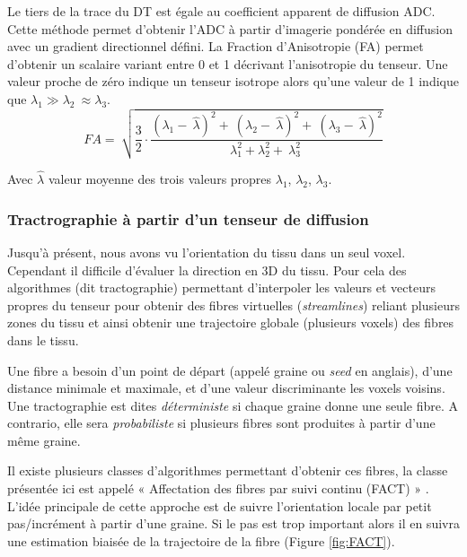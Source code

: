 Le tiers de la trace du DT est égale au coefficient apparent de diffusion ADC. Cette méthode permet d’obtenir l’ADC à partir d’imagerie pondérée en diffusion avec un gradient directionnel défini. La Fraction d’Anisotropie (FA) permet d’obtenir un scalaire variant entre 0 et 1 décrivant l’anisotropie du tenseur. Une valeur proche de zéro indique un tenseur isotrope alors qu’une valeur de 1 indique que $\lambda_1\gg\lambda_2\ \approx\lambda_3$.
\begin{equation}
\nonumber
FA=\ \sqrt{\frac{3}{2}\cdot\frac{{(\lambda_1-\ \hat{\lambda})}^2+\ {(\lambda_2-\ \hat{\lambda})}^2+\ {(\lambda_3-\ \hat{\lambda})}^2}{\lambda_1^2+\lambda_2^2+\ \lambda_3^2\ }}
\end{equation}

Avec $\hat{\lambda}$ valeur moyenne des trois valeurs propres $\lambda_1$, $\lambda_2$, $\lambda_3$. 

\subsubsection{Tractrographie à partir d’un tenseur de diffusion}

Jusqu’à présent, nous avons vu l’orientation du tissu dans un seul voxel. Cependant il difficile d’évaluer la direction en 3D du tissu. Pour cela des algorithmes (dit tractographie) permettant d’interpoler les valeurs et vecteurs propres du tenseur pour obtenir des fibres virtuelles (\textit{streamlines}) reliant plusieurs zones du tissu et ainsi obtenir une trajectoire globale (plusieurs voxels) des fibres dans le tissu.

Une fibre a besoin d’un point de départ (appelé graine ou \textit{seed} en anglais), d’une distance minimale et maximale, et d’une valeur discriminante les voxels voisins. Une tractographie est dites \textit{déterministe} si chaque graine donne une seule fibre. A contrario, elle sera \textit{probabiliste} si plusieurs fibres sont produites à partir d’une même graine.

Il existe plusieurs classes d’algorithmes permettant d’obtenir ces fibres, la classe présentée ici est appelé « Affectation des fibres par suivi continu (FACT) » \cite{Mori1999}. L’idée principale de cette approche est de suivre l’orientation locale par petit pas/incrément à partir d’une graine. Si le pas est trop important alors il en suivra une estimation biaisée de la trajectoire de la fibre (Figure \ref{fig:FACT}).

